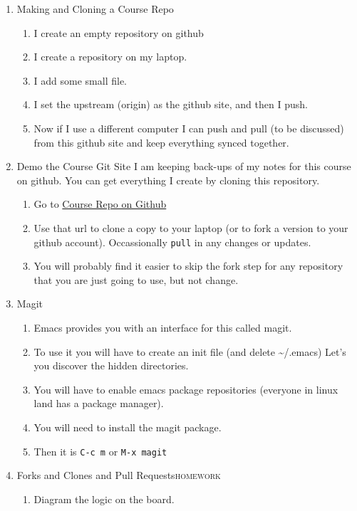 \documentclass{article}
\begin{document}
\begin{enumerate}
\begin{enumerate}
\end{enumerate}
\item Making and Cloning a Course Repo
\label{sec:org189a349}
\begin{enumerate}
\item I create an empty repository on github
\item I create a repository on my laptop.
\item I add some small file.
\item I set the upstream (origin) as the github site, and then I push.
\item Now if I use a different computer I can push and pull (to be discussed) from this github site and keep everything synced together.
\end{enumerate}
\item Demo the Course Git Site
\label{sec:org47a9361}
I am keeping back-ups of my notes for this course on github. You can get everything I create by cloning this repository.
\begin{enumerate}
\item Go to \href{https://github.com/brittAnderson/psych363}{Course Repo on Github}
\item Use that url to clone a copy to your laptop (or to fork a version to your github account). Occassionally \texttt{pull} in any changes or updates.
\item You will probably find it easier to skip the fork step for any repository that you are just going to use, but not change.
\end{enumerate}
\item Magit
\label{sec:org90a07a0}
\begin{enumerate}
\item Emacs provides you with an interface for this called magit.
\item To use it you will have to create an init file (and delete \textasciitilde{}/.emacs)
Let's you discover the hidden directories.
\item You will have to enable emacs package repositories (everyone in linux land has a package manager).
\item You will need to install the magit package.
\item Then it is \texttt{C-c m} or \texttt{M-x magit}
\end{enumerate}
\item Forks and Clones and Pull Requests\hfill{}\textsc{homework}
\label{sec:orgde7a960}
\begin{enumerate}
\item Diagram the logic on the board.

\end{enumerate}
\end{enumerate}
\end{document}
